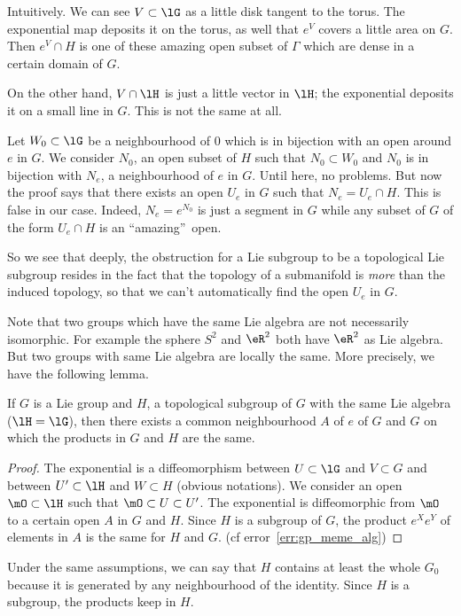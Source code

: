 Intuitively. We can see $V\subset\lG$ as a little disk tangent to  the torus. The exponential map deposits it on the torus, as well that $e^V$ covers a little area on $G$. Then $e^V\cap H$ is one of these amazing open subset of $\Gamma$ which are dense in a certain domain of $G$.

On the other hand, $V\cap\lH$ is just a little vector in $\lH$; the exponential deposits it on a small line in $G$. This is not the same at all.

Let $W_0\subset\lG$  be a neighbourhood of $0$ which is in bijection with an open around $e$ in $G$. We consider $N_0$, an open subset of $H$ such that $N_0\subset W_0$ and $N_0$ is in bijection with $N_e$, a neighbourhood of $e$ in $G$. Until here, no problems. But now the proof says that there exists an open $U_e$ in $G$ such that $N_e=U_e\cap H$. This is false in our case. Indeed, $N_e=e^{N_0}$ is just a segment in $G$ while any subset of $G$ of the form $U_e\cap H$ is an ``amazing''\ open.

So we see that deeply, the obstruction for a Lie subgroup to be a topological Lie subgroup resides in the fact that the topology of a submanifold is \emph{more} than the induced topology, so that we can't automatically find the open $U_e$ in $G$.


Note that two groups which have the same Lie algebra are not necessarily isomorphic. For example the sphere $S^2$ and $\eR^2$ both have $\eR^2$ as Lie algebra. But two groups with same Lie algebra are locally the same. More precisely, we have the following lemma.

\begin{lemma}
	If $G$ is a Lie group and $H$, a topological subgroup of $G$ with the same Lie algebra ($\lH=\lG$), then there exists a common neighbourhood $A$ of $e$ of $G$ and $G$ on which the products in $G$ and $H$ are the same.
\end{lemma}

\begin{proof}
	The exponential is a diffeomorphism between $U\subset\lG$ and $V\subset G$ and between $U'\subset\lH$ and $W\subset H$ (obvious notations). We consider an open $\mO\subset\lH$ such that $\mO\subset U\subset U'$. The exponential is diffeomorphic from $\mO$ to a certain open $A$ in $G$ and $H$. Since $H$ is a subgroup of $G$, the product $e^Xe^Y$ of elements in $A$ is the same for $H$ and $G$. (cf error~\ref{err:gp_meme_alg})
\end{proof}

Under the same assumptions, we can say that $H$ contains at least the whole $G_0$ because it is generated by any neighbourhood of the identity. Since $H$ is a subgroup, the products keep in $H$.

